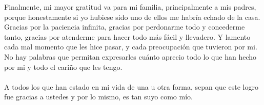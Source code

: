 Finalmente, mi mayor gratitud va para mi familia, principalmente a mis padres, porque honestamente si yo hubiese sido uno de ellos me habría echado de la casa. Gracias por la paciencia infinita, gracias por perdonarme todo y concederme tanto, gracias por atenderme para hacer todo más fácil y llevadero. Y lamento cada mal momento que les hice pasar, y cada preocupación que tuvieron por mi. No hay palabras que permitan expresarles cuánto aprecio todo lo que han hecho por mi y todo el cariño que les tengo.\\\\
A todos los que han estado en mi vida de una u otra forma, sepan que este logro fue gracias a ustedes y por lo mismo, es tan suyo como mío.
